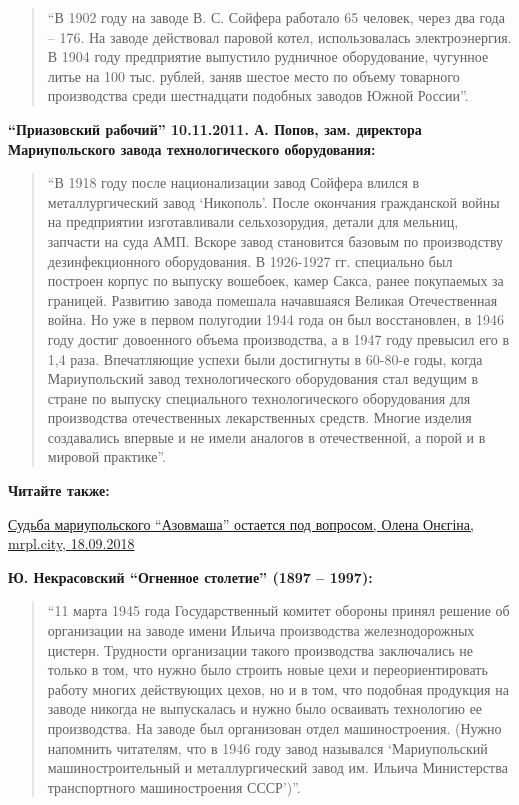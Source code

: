 \begin{quote}
\enquote{В 1902 году на заводе В. С.
Сойфера работало 65 человек, через два года – 176. На заводе действовал паровой
котел, использовалась электроэнергия. В 1904 году предприятие выпустило
рудничное оборудование, чугунное литье на 100 тыс. рублей, заняв шестое место
по объему товарного производства среди шестнадцати подобных заводов Южной
России}. 
\end{quote}

\textbf{\enquote{Приазовский рабочий} 10.11.2011. А. Попов, зам. директора Мариупольского завода технологического оборудования:} 

\begin{quote}
\enquote{В 1918 году после национализации завод Сойфера влился в металлургический завод
\enquote{Никополь}. После окончания гражданской войны на предприятии изготавливали
сельхозорудия, детали для мельниц, запчасти на суда АМП. Вскоре завод
становится базовым по производству дезинфекционного оборудования. В 1926-1927
гг. специально был построен корпус по выпуску вошебоек, камер Сакса, ранее
покупаемых за границей. Развитию завода помешала начавшаяся Великая
Отечественная война. Но уже в первом полугодии 1944 года он был восстановлен, в
1946 году достиг довоенного объема производства, а в 1947 году превысил его в
1,4 раза. Впечатляющие успехи были достигнуты в 60-80-е годы, когда
Мариупольский завод технологического оборудования стал ведущим в стране по
выпуску специального технологического оборудования для производства
отечественных лекарственных средств. Многие изделия создавались впервые и не
имели аналогов в отечественной, а порой и в мировой практике}.
\end{quote}

\textbf{Читайте также:} 

\vspace{0.5cm}
\begin{minipage}{0.9\textwidth}
\href{https://mrpl.city/news/view/sudba-mariupolskogo-azovmasha-ostaetsya-pod-voprosom}{%
Судьба мариупольского \enquote{Азовмаша} остается под вопросом, Олена Онєгіна, mrpl.city, 18.09.2018}
\end{minipage}
\vspace{0.5cm}

\textbf{Ю. Некрасовский \enquote{Огненное столетие} (1897 – 1997):} 

\begin{quote}
\enquote{11 марта 1945 года Государственный комитет обороны принял решение об
организации на заводе имени Ильича производства железнодорожных цистерн.
Трудности организации такого производства заключались не только в том, что
нужно было строить новые цехи и переориентировать работу многих действующих
цехов, но и в том, что подобная продукция на заводе никогда не выпускалась и
нужно было осваивать технологию ее производства. На заводе был организован
отдел машиностроения. (Нужно напомнить читателям, что в 1946 году завод
назывался \enquote{Мариупольский машиностроительный и металлургический завод им. Ильича
Министерства транспортного машиностроения СССР})}. 
\end{quote}


